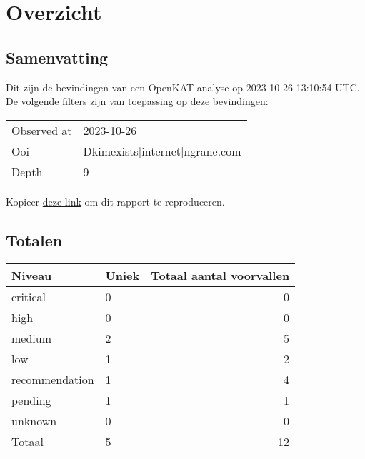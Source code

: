 \documentclass[11pt, a4paper]{report}
\begin{document}
\newpage

\chapter{Overzicht}

\section{Samenvatting}
Dit zijn de bevindingen van een OpenKAT-analyse op 2023-10-26 13:10:54 UTC. %
De volgende filters zijn van toepassing op deze bevindingen:

\begin{longtable}{ p{}  p{} }

            Observed at & 2023{-}10{-}26 \\

            Ooi & Dkimexists|internet|ngrane.com \\

            Depth & 9 \\

\end{longtable}



    \noindent Kopieer \href{http://localhost:8000/nl/_steven/objects/report/?observed_at=2023-10-26&depth=9&ooi_id=DKIMExists%7Cinternet%7Cngrane.com}{deze link} om dit rapport te reproduceren.



\bgroup{}
\def\arraystretch{1.2}
\section{Totalen}
\begin{tabular}{ llr }
	Niveau & Uniek & Totaal aantal voorvallen \\\toprule
	\toprule

		\colorbox{box-color-critical}{ \color{color-critical} critical } & 0 & 0 \\

		\colorbox{box-color-high}{ \color{color-high} high } & 0 & 0 \\

		\colorbox{box-color-medium}{ \color{color-medium} medium } & 2 & 5 \\

		\colorbox{box-color-low}{ \color{color-low} low } & 1 & 2 \\

		\colorbox{box-color-recommendation}{ \color{color-recommendation} recommendation } & 1 & 4 \\

		\colorbox{box-color-pending}{ \color{color-pending} pending } & 1 & 1 \\

		\colorbox{box-color-unknown}{ \color{color-unknown} unknown } & 0 & 0 \\

	\bottomrule
	Totaal & 5 & 12
\end{tabular}
\egroup{}
\end{document}
